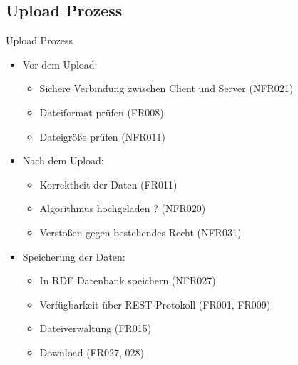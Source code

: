 \documentclass{beamer}
\begin{document}
	\subsection[Upload Prozess]{Upload Prozess}
	\begin{frame}[<+->][t]{Upload Prozess}
		\begin{itemize}		
			\item Vor dem Upload:
			\begin{itemize}	
				\item Sichere Verbindung zwischen Client und Server (NFR021)
				\item Dateiformat prüfen (FR008)
				\item Dateigröße prüfen (NFR011)
			\end{itemize}
			
			\item Nach dem Upload:
			\begin{itemize}	
				\item Korrektheit der Daten (FR011)
				\item Algorithmus hochgeladen ? (NFR020)
				\item Verstoßen gegen bestehendes Recht (NFR031)
			\end{itemize}

			\item Speicherung der Daten:
			\begin{itemize}	
				\item In RDF Datenbank speichern (NFR027)
				\item Verfügbarkeit über REST-Protokoll (FR001, FR009)
				\item Dateiverwaltung (FR015)
				\item Download (FR027, 028)
			\end{itemize}
		\end{itemize}
	\end{frame}
		
\end{document}
